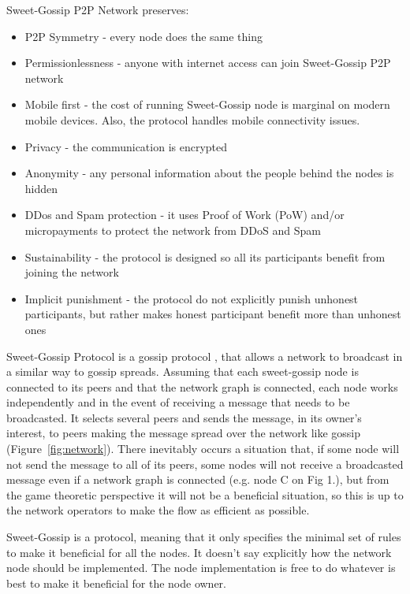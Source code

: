 \documentclass{article}
\begin{document}
Sweet-Gossip P2P Network preserves:
\begin{itemize}
\item P2P Symmetry - every node does the same thing
\item Permissionlessness - anyone with internet access can join Sweet-Gossip P2P network
\item Mobile first - the cost of running Sweet-Gossip node is marginal on modern mobile devices. Also, the protocol handles mobile connectivity issues.
\item Privacy - the communication is encrypted
\item Anonymity - any personal information about the people behind the nodes is hidden
\item DDos and Spam protection - it uses Proof of Work (PoW) and/or micropayments to protect the network from DDoS and Spam
\item Sustainability - the protocol is designed so all its participants benefit from joining the network
\item Implicit punishment - the protocol do not explicitly punish unhonest participants, but rather makes honest participant benefit more than unhonest ones
\end{itemize}

Sweet-Gossip Protocol is a gossip protocol \cite{Fanout}, that allows a network to broadcast in a similar way to gossip spreads. Assuming that each sweet-gossip node is connected to its peers and that the network graph is connected, each node works independently and in the event of receiving a message that needs to be broadcasted. It selects several peers and sends the message, in its owner's interest, to peers making the message spread over the network like gossip (Figure~\ref{fig:network}). There inevitably occurs a situation that, if some node will not send the message to all of its peers, some nodes will not receive a broadcasted message even if a network graph is connected (e.g. node C on Fig 1.), but from the game theoretic perspective it will not be a beneficial situation, so this is up to the network operators to make the flow as efficient as possible.

Sweet-Gossip is a protocol, meaning that it only specifies the minimal set of rules to make it beneficial for all the nodes. It doesn't say explicitly how the network node should be implemented. The node implementation is free to do whatever is best to make it beneficial for the node owner.
\end{document}
